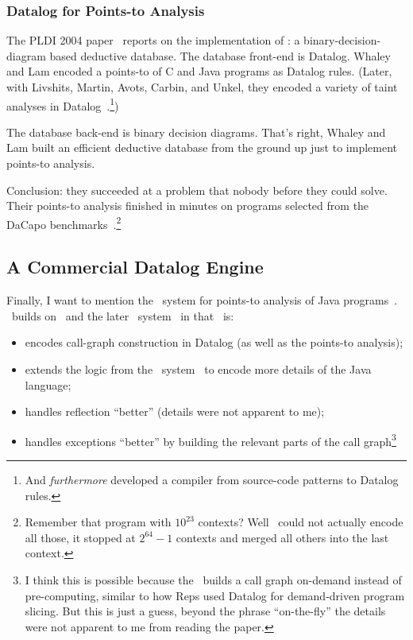 \documentclass{article}
\begin{document}
\subsubsection*{Datalog for Points-to Analysis}

The PLDI 2004 paper~\cite{wl-pldi-2004} reports on the implementation of \bddbddb{}: a binary-decision-diagram based deductive database.
The database front-end is Datalog.
Whaley and Lam encoded a points-to of C and Java programs as Datalog rules.
(Later, with Livshits, Martin, Avots, Carbin, and Unkel, they encoded a variety of taint analyses in Datalog~\cite{lwlmacu-pods-2005}.\footnote{And \emph{furthermore} developed a compiler from source-code patterns to Datalog rules.})

The database back-end is binary decision diagrams.
That's right, Whaley and Lam built an efficient deductive database from the ground up just to implement points-to analysis.

Conclusion: they succeeded at a problem that nobody before they could solve.
Their points-to analysis finished in minutes on programs selected from the DaCapo benchmarks~\cite{bghkmbdffghhjlmpsvvw-oopsla-2006}.\footnote{Remember that program with $10^23$ contexts? Well \bddbddb\ could not actually encode all those, it stopped at $2^64 - 1$ contexts and merged all others into the last context.}


\subsection*{A Commercial Datalog Engine}

Finally, I want to mention the \doop\ system for points-to analysis of Java programs~\cite{bs-oopsla-2009}.
\doop\ builds on \bddbddb\ and the later \paddle\ system~\cite{lh-tosem-2008} in that \doop\ is:
\begin{itemize}
\item encodes call-graph construction in Datalog (as well as the points-to analysis);
\item extends the logic from the \paddle\ system~\cite{lh-tosem-2008} to encode more details of the Java language;
\item handles reflection ``better'' (details were not apparent to me);
\item handles exceptions ``better'' by building the relevant parts of the call graph\footnote{I think this is possible because the \doop\ builds a call graph on-demand instead of pre-computing, similar to how Reps used Datalog for demand-driven program slicing. But this is just a guess, beyond the phrase ``on-the-fly'' the details were not apparent to me from reading the paper.}
\end{itemize}
\end{document}
